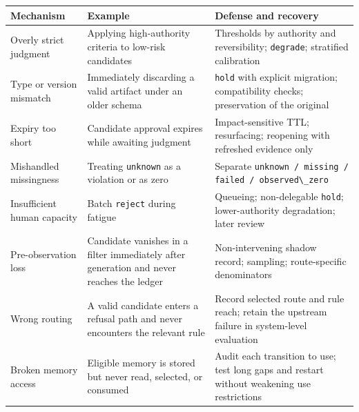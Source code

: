 {\def\LTcaptype{none} %
\begin{longtable}[]{@{}
  >{\raggedright\arraybackslash}p{}
  >{\raggedright\arraybackslash}p{}
  >{\raggedright\arraybackslash}p{}@{}}
\toprule\noalign{}
\begin{minipage}[b]{\linewidth}\raggedright
Mechanism
\end{minipage} & \begin{minipage}[b]{\linewidth}\raggedright
Example
\end{minipage} & \begin{minipage}[b]{\linewidth}\raggedright
Defense and recovery
\end{minipage} \\
\midrule\noalign{}
\endhead
\bottomrule\noalign{}
\endlastfoot
Overly strict judgment & Applying high-authority criteria to low-risk candidates & Thresholds by authority and reversibility; \passthrough{\lstinline!degrade!}; stratified calibration \\
Type or version mismatch & Immediately discarding a valid artifact under an older schema & \passthrough{\lstinline!hold!} with explicit migration; compatibility checks; preservation of the original \\
Expiry too short & Candidate approval expires while awaiting judgment & Impact-sensitive TTL; resurfacing; reopening with refreshed evidence only \\
Mishandled missingness & Treating \passthrough{\lstinline!unknown!} as a violation or as zero & Separate \passthrough{\lstinline!unknown / missing / failed / observed\_zero!} \\
Insufficient human capacity & Batch \passthrough{\lstinline!reject!} during fatigue & Queueing; non-delegable \passthrough{\lstinline!hold!}; lower-authority degradation; later review \\
Pre-observation loss & Candidate vanishes in a filter immediately after generation and never reaches the ledger & Non-intervening shadow record; sampling; route-specific denominators \\
Wrong routing & A valid candidate enters a refusal path and never encounters the relevant rule & Record selected route and rule reach; retain the upstream failure in system-level evaluation \\
Broken memory access & Eligible memory is stored but never read, selected, or consumed & Audit each transition to use; test long gaps and restart without weakening use restrictions \\
\end{longtable}
}

